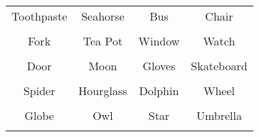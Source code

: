 \documentclass[12pt,a4paper]{article}
\begin{document}
\thispagestyle{empty}
\begin{table}[]
\centering
\Huge
\begin{tabular}{cccc}
 Toothpaste& Seahorse& Bus& Chair\\  & & & \\
 Fork& Tea Pot& Window& Watch\\  & & & \\
 Door& Moon& Gloves& Skateboard\\  & & & \\
 Spider& Hourglass& Dolphin& Wheel\\  & & & \\
 Globe& Owl& Star& Umbrella\\  & & & \\
\end{tabular}
\end{table}
\end{document}
